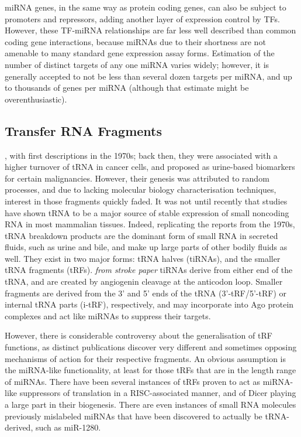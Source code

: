 
miRNA genes, in the same way as protein coding genes, can also be subject to promoters and repressors, adding another layer of expression control by TFs. However, these TF-miRNA relationships are far less well described than common coding gene interactions, because miRNAs due to their shortness are not amenable to many standard gene expression assay forms. Estimation of the number of distinct targets of any one miRNA varies widely; however, it is generally accepted to not be less than several dozen targets per miRNA, and up to thousands of genes per miRNA (although that estimate might be overenthusiastic).


\subsection{Transfer RNA Fragments}
, with first descriptions in the 1970s; back then, they were associated with a higher turnover of tRNA in cancer cells\cite{Borek1977}, and proposed as urine-based biomarkers for certain malignancies\cite{Speer1979}. However, their genesis was attributed to random processes, and due to lacking molecular biology characterisation techniques, interest in those fragments quickly faded. It was not until recently that studies have shown tRNA to be a major source of stable expression of small noncoding RNA\cite{Cole2009,Lee2009} in most mammalian tissues. Indeed, replicating the reports from the 1970s, tRNA breakdown products are the dominant form of small RNA in secreted fluids, such as urine and bile, and make up large parts of other bodily fluids as well\cite{Godoy2018}. They exist in two major forms: tRNA halves (tiRNAs), and the smaller tRNA fragments (tRFs). \textit{from stroke paper} tiRNAs derive from either end of the tRNA, and are created by angiogenin cleavage at the anticodon loop\cite{Yamasaki2009,Ivanov2011}. Smaller fragments are derived from the 3’ and 5’ ends of the tRNA (3'-tRF/5'-tRF) or internal tRNA parts (i-tRF), respectively, and may incorporate into Ago protein complexes and act like miRNAs to suppress their targets\cite{Burroughs2011,Kumar2014}.

However, there is considerable controversy about the generalisation of tRF functions, as distinct publications discover very different and sometimes opposing mechanisms of action for their respective fragments. An obvious assumption is the miRNA-like functionality, at least for those tRFs that are in the length range of miRNAs. There have been several instances of tRFs proven to act as miRNA-like suppressors of translation in a RISC-associated manner\cite{Kumar2014}, and of Dicer playing a large part in their biogenesis\cite{Cole2009}. There are even instances of small RNA molecules previously mislabeled miRNAs that have been discovered to actually be tRNA-derived, such as miR-1280\cite{Huang2017}.

